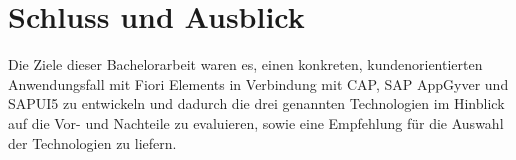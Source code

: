 
\chapter{Schluss und Ausblick}

Die Ziele dieser Bachelorarbeit waren es, einen konkreten, kundenorientierten Anwendungsfall mit Fiori Elements in Verbindung mit CAP, SAP AppGyver und SAPUI5 zu entwickeln und dadurch die drei genannten Technologien im Hinblick auf die Vor- und Nachteile zu evaluieren, sowie eine Empfehlung für die Auswahl der Technologien zu liefern.










